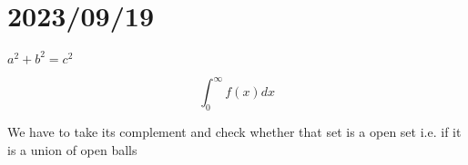 \chapter{2023/09/19}

$a^2 + b^2 = c^2$

$$ \int_{0}^{\infty} f(x) dx$$ 

\dfn{}{}
\qs{}{}
\sol We have to take its complement and check whether that set is a open set i.e. if it is a union of open balls
\nt{}
\clm{}{}{}
\ex{}{
}
\thm{}{}
\begin{myproof}
\end{myproof}

\cor{}{}
\mlenma{}{}
\mprop{}{}
